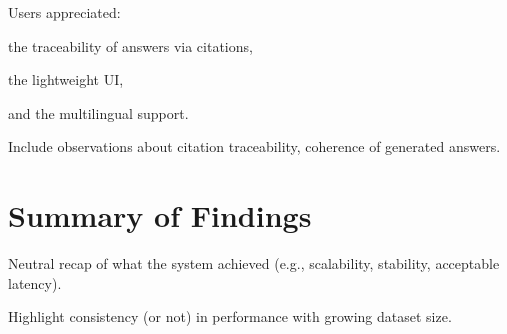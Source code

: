 \begin{spacing}{1.5}
Users appreciated:

the traceability of answers via citations,

the lightweight UI,

and the multilingual support.


Include observations about citation traceability, coherence of generated answers.

\section{Summary of Findings}
Neutral recap of what the system achieved (e.g., scalability, stability, acceptable latency).

Highlight consistency (or not) in performance with growing dataset size.

\end{spacing}